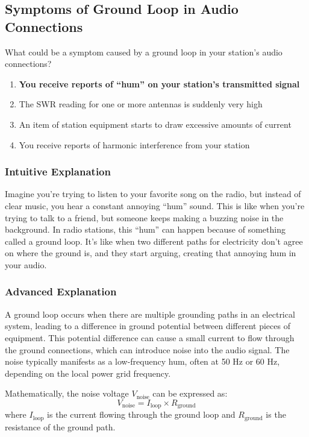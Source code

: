 \subsection{Symptoms of Ground Loop in Audio Connections}
\label{G4C10}

\begin{tcolorbox}[colback=gray!10!white,colframe=black!75!black,title=G4C10]
What could be a symptom caused by a ground loop in your station’s audio connections?
\begin{enumerate}[label=\Alph*),noitemsep]
    \item \textbf{You receive reports of “hum” on your station’s transmitted signal}
    \item The SWR reading for one or more antennas is suddenly very high
    \item An item of station equipment starts to draw excessive amounts of current
    \item You receive reports of harmonic interference from your station
\end{enumerate}
\end{tcolorbox}

\subsubsection{Intuitive Explanation}
Imagine you’re trying to listen to your favorite song on the radio, but instead of clear music, you hear a constant annoying “hum” sound. This is like when you’re trying to talk to a friend, but someone keeps making a buzzing noise in the background. In radio stations, this “hum” can happen because of something called a ground loop. It’s like when two different paths for electricity don’t agree on where the ground is, and they start arguing, creating that annoying hum in your audio.

\subsubsection{Advanced Explanation}
A ground loop occurs when there are multiple grounding paths in an electrical system, leading to a difference in ground potential between different pieces of equipment. This potential difference can cause a small current to flow through the ground connections, which can introduce noise into the audio signal. The noise typically manifests as a low-frequency hum, often at 50 Hz or 60 Hz, depending on the local power grid frequency.

Mathematically, the noise voltage \( V_{\text{noise}} \) can be expressed as:
\[ V_{\text{noise}} = I_{\text{loop}} \times R_{\text{ground}} \]
where \( I_{\text{loop}} \) is the current flowing through the ground loop and \( R_{\text{ground}} \) is the resistance of the ground path.

